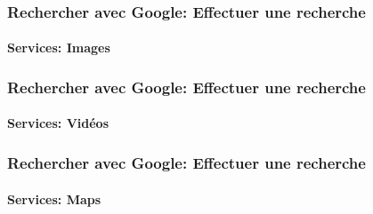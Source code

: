 \documentclass[xcolor=table]{beamer}
\begin{document}
\begin{frame}
\frametitle{Rechercher avec Google: Effectuer une recherche}
\framesubtitle{Services: Images}

\begin{center}
\end{center}

\end{frame}

\begin{frame}
\frametitle{Rechercher avec Google: Effectuer une recherche}
\framesubtitle{Services: Vidéos}

\begin{center}
\end{center}

\end{frame}

\begin{frame}
\frametitle{Rechercher avec Google: Effectuer une recherche}
\framesubtitle{Services: Maps}

\begin{center}
\end{center}

\end{frame}
\end{document}
